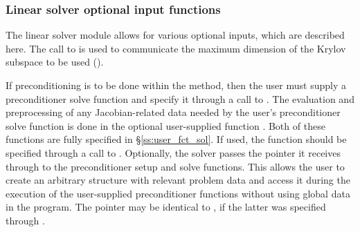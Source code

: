 \subsubsection{Linear solver optional input functions}
The {\kinspgmr} linear solver module allows for various optional 
inputs, which are described here.
The call to  is used to communicate the maximum dimension of the
Krylov subspace to be used (). 

If preconditioning is to be done within the {\spgmr} method,
then the user must supply a preconditioner solve function 
and specify it through a call to .
The evaluation and preprocessing of any Jacobian-related data needed
by the user's preconditioner solve function is done in the optional
user-supplied function . Both of these functions are
fully specified in \S\ref{ss:user_fct_sol}.
If used, the  function should be specified through a call to
.
Optionally, the {\kinspgmr} solver passes the pointer it receives through 
 to the preconditioner setup and solve functions.  
This allows the user to create an arbitrary structure with relevant problem data 
and access it during the execution of the user-supplied preconditioner functions
without using global data in the program.  
The pointer  may be identical to , if the latter was 
specified through .

